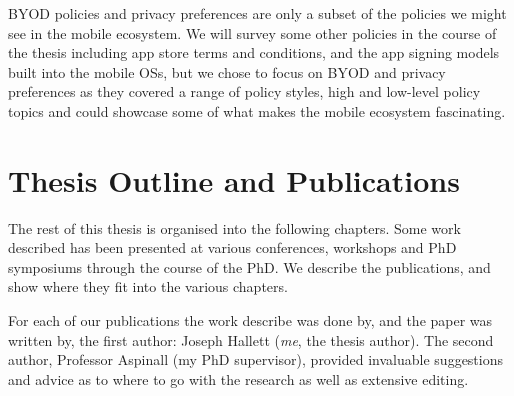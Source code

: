 \documentclass[thesis.tex]{subfiles}
\begin{document}
BYOD policies and privacy preferences are only a subset of the
policies we might see in the mobile ecosystem.  We will survey some
other policies in the course of the thesis including app store terms
and conditions, and the app signing models built into the mobile OSs,
but we chose to focus on BYOD and privacy preferences as they covered
a range of policy styles, high and low-level policy topics and could
showcase some of what makes the mobile ecosystem fascinating.

\section{Thesis Outline and Publications}

The rest of this thesis is organised into the following chapters.  Some work
described has been presented at various conferences, workshops and PhD
symposiums through the course of the PhD.  We describe the publications, and
show where they fit into the various chapters.

For each of our publications the work describe was done by, and the paper was
written by, the first author: Joseph Hallett (\emph{me}, the thesis author).
The second author, Professor Aspinall (my PhD supervisor), provided invaluable suggestions
and advice as to where to go with the research as well as extensive editing.
\end{document}
